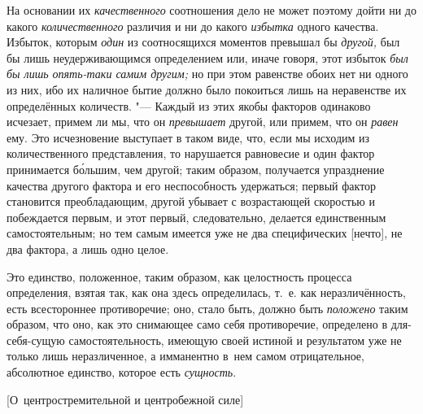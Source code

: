 На основании их {\em качественного} соотношения дело не может поэтому дойти ни
до какого {\em количественного} различия и ни до какого {\em избытка} одного
качества. Избыток, которым {\em один} из соотносящихся моментов превышал бы
{\em другой,} был бы лишь неудерживающимся определением или, иначе говоря, этот
избыток {\em был бы лишь опять-таки самим другим;} но при этом равенстве обоих
нет ни одного из них, ибо их наличное бытие должно было покоиться лишь на
неравенстве их определённых количеств. "--- Каждый из этих якобы факторов
одинаково исчезает, примем ли мы, что он {\em превышает} другой, или примем,
что он {\em равен} ему. Это исчезновение выступает в таком виде, что, если мы
исходим из количественного представления, то нарушается равновесие и один
фактор принимается б\'{о}льшим, чем другой; таким образом, получается
упразднение качества другого фактора и его неспособность удержаться; первый
фактор становится преобладающим, другой убывает с возрастающей скоростью и
побеждается первым, и этот первый, следовательно, делается единственным
самостоятельным; но тем самым имеется уже не два специфических [нечто], не два
фактора, а лишь одно целое.

Это единство, положенное, таким образом, как целостность процесса определения,
взятая так, как она здесь определилась, т.~е. как неразличённость, есть
всестороннее противоречие; оно, стало быть, должно быть {\em положено} таким
образом, что оно, как это снимающее само себя противоречие, определено в
для-себя-сущую самостоятельность, имеющую своей истиной и результатом уже не
только лишь неразличенное, а имманентно в~нем самом отрицательное, абсолютное
единство, которое есть {\em сущность}.

%
{[О~центростремительной и центробежной силе]}

